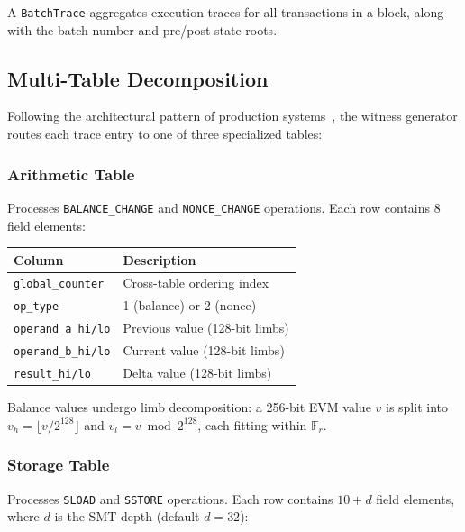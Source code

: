 \documentclass[conference]{IEEEtran}
\newcommand{\Fr}{\mathbb{F}_r}
\begin{document}
A \texttt{BatchTrace} aggregates execution traces for all transactions
in a block, along with the batch number and pre/post state roots.

\subsection{Multi-Table Decomposition}

Following the architectural pattern of production
systems~\cite{polygon-zkEVM-2023, scroll-2024}, the witness generator
routes each trace entry to one of three specialized tables:

\subsubsection{Arithmetic Table}
Processes \texttt{BALANCE\_CHANGE} and \texttt{NONCE\_CHANGE}
operations. Each row contains 8 field elements:

\begin{center}
\small
\begin{tabular}{ll}
\toprule
\textbf{Column} & \textbf{Description} \\
\midrule
\texttt{global\_counter} & Cross-table ordering index \\
\texttt{op\_type} & 1 (balance) or 2 (nonce) \\
\texttt{operand\_a\_hi/lo} & Previous value (128-bit limbs) \\
\texttt{operand\_b\_hi/lo} & Current value (128-bit limbs) \\
\texttt{result\_hi/lo} & Delta value (128-bit limbs) \\
\bottomrule
\end{tabular}
\end{center}

Balance values undergo limb decomposition: a 256-bit EVM value $v$ is
split into $v_h = \lfloor v / 2^{128} \rfloor$ and
$v_l = v \bmod 2^{128}$, each fitting within $\Fr$.

\subsubsection{Storage Table}
Processes \texttt{SLOAD} and \texttt{SSTORE} operations. Each row
contains $10 + d$ field elements, where $d$ is the SMT depth (default
$d = 32$):
\end{document}
